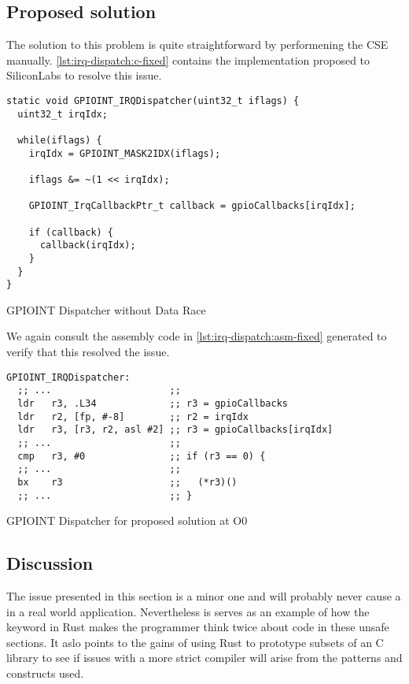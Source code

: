 \subsection{Proposed solution}

The solution to this problem is quite straightforward by performening the \gls{CSE} manually.
\autoref{lst:irq-dispatch:c-fixed} contains the implementation proposed to SiliconLabs to resolve this issue.

\begin{listing}[H]
  \begin{verbatim}
static void GPIOINT_IRQDispatcher(uint32_t iflags) {
  uint32_t irqIdx;

  while(iflags) {
    irqIdx = GPIOINT_MASK2IDX(iflags);

    iflags &= ~(1 << irqIdx);

    GPIOINT_IrqCallbackPtr_t callback = gpioCallbacks[irqIdx];

    if (callback) {
      callback(irqIdx);
    }
  }
}
  \end{verbatim}
  \caption{GPIOINT Dispatcher without Data Race}
  \label{lst:irq-dispatch:c-fixed}
\end{listing}

We again consult the assembly code in \autoref{lst:irq-dispatch:asm-fixed} generated to verify that this resolved the issue.

\begin{listing}[H]
  \begin{verbatim}
GPIOINT_IRQDispatcher:
  ;; ...                     ;;
  ldr   r3, .L34             ;; r3 = gpioCallbacks
  ldr   r2, [fp, #-8]        ;; r2 = irqIdx
  ldr   r3, [r3, r2, asl #2] ;; r3 = gpioCallbacks[irqIdx]
  ;; ...                     ;;
  cmp   r3, #0               ;; if (r3 == 0) {
  ;; ...                     ;;
  bx    r3                   ;;   (*r3)()
  ;; ...                     ;; }
  \end{verbatim}
  \caption{GPIOINT Dispatcher for proposed solution at O0}
  \label{lst:irq-dispatch:asm-fixed}
\end{listing}

\subsection{Discussion}

The issue presented in this section is a minor one and will probably never cause a  in a real world application.
Nevertheless is serves as an example of how the {\unsafe} keyword in Rust makes the programmer think twice about code in these unsafe sections.
It aslo points to the gains of using Rust to prototype subsets of an C library to see if issues with a more strict compiler will arise from the patterns and constructs used.
